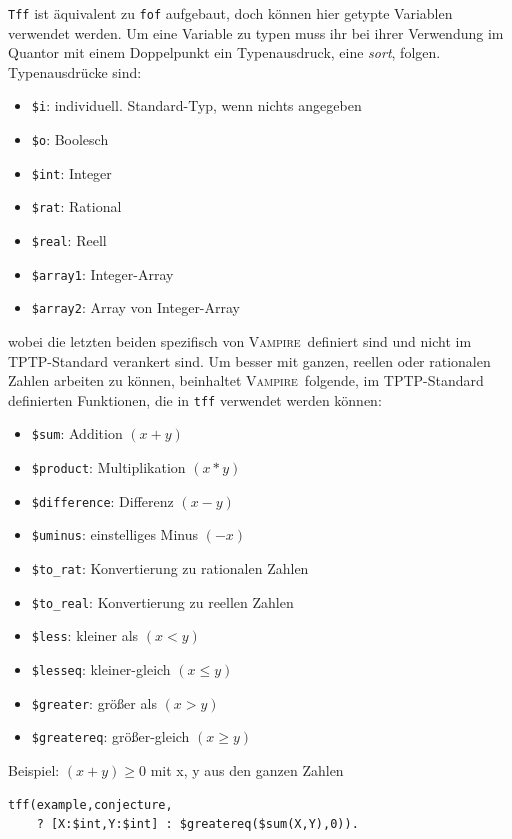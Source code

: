 \documentclass{article}
\newcommand{\vampire}{\textsc{Vampire}~}
\begin{document}
\texttt{Tff} ist äquivalent zu \texttt{fof} aufgebaut, doch können hier getypte Variablen verwendet werden. Um eine Variable zu typen muss ihr bei ihrer Verwendung im Quantor mit einem Doppelpunkt ein Typenausdruck, eine \textit{sort}, folgen. \\
Typenausdrücke sind: \begin{itemize}
	\item \verb=$i=: individuell. Standard-Typ, wenn nichts angegeben
	\item \verb=$o=: Boolesch
	\item \verb=$int=: Integer
	\item \verb=$rat=: Rational
	\item \verb=$real=: Reell
	\item \verb=$array1=: Integer-Array
	\item \verb=$array2=: Array von Integer-Array
\end{itemize}
wobei die letzten beiden spezifisch von \vampire definiert sind und nicht im TPTP-Standard verankert sind.
Um besser mit ganzen, reellen oder rationalen Zahlen arbeiten zu können, beinhaltet \vampire folgende, im TPTP-Standard definierten Funktionen, die in \texttt{tff} verwendet werden können:
\begin{itemize}
	\item \verb=$sum=: Addition $(x + y)$
	\item \verb=$product=: Multiplikation $(x * y)$
	\item \verb=$difference=: Differenz $(x - y)$
	\item \verb=$uminus=: einstelliges Minus $(-x)$
	\item \verb=$to_rat=: Konvertierung zu rationalen Zahlen
	\item \verb=$to_real=: Konvertierung zu reellen Zahlen
	\item \verb=$less=: kleiner als $(x < y)$
	\item \verb=$lesseq=: kleiner-gleich $(x \leq y)$
	\item \verb=$greater=: größer als $(x > y)$
	\item \verb=$greatereq=: größer-gleich $(x \geq y)$ 
\end{itemize}
Beispiel: $(x + y) \geq 0$ mit x, y aus den ganzen Zahlen
\begin{lstlisting}[language=tptp]
tff(example,conjecture, 
	? [X:$int,Y:$int] : $greatereq($sum(X,Y),0)).\end{lstlisting} \cite[S. 24-25]{cav2013}
	
\end{document}

